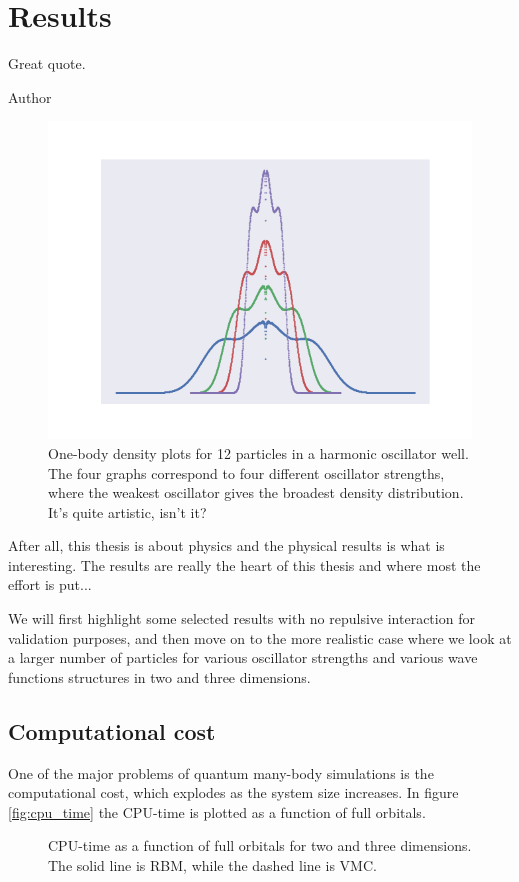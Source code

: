 \chapter{Results} \label{sec:results}
\epigraph{Great quote.}{Author}
\begin{figure}[H]
	\centering
	\includegraphics[scale=0.8]{Images/art.png}
	\caption{One-body density plots for 12 particles in a harmonic oscillator well. The four graphs correspond to four different oscillator strengths, where the weakest oscillator gives the broadest density distribution. It's quite artistic, isn't it?}
\end{figure}
After all, this thesis is about physics and the physical results is what is interesting. 
The results are really the heart of this thesis and where most the effort is put... 

We will first highlight some selected results with no repulsive interaction for validation purposes, and then move on to the more realistic case where we look at a larger number of particles for various oscillator strengths and various wave functions structures in two and three dimensions.  

\newpage
\section{Computational cost}
One of the major problems of quantum many-body simulations is the computational cost, which explodes as the system size increases. In figure \eqref{fig:cpu_time} the CPU-time is plotted as a function of full orbitals. 
\begin{figure}[H]
	\centering
	
	\label{fig:cpu_time}
	\caption{CPU-time as a function of full orbitals for two and three dimensions. The solid line is RBM, while the dashed line is VMC.}
\end{figure}

